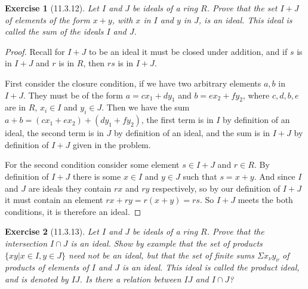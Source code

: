 \documentclass[12pt]{article}
\newtheorem*{exer}{Exercise}
\begin{document}

\begin{exer}[11.3.12]

    Let $I$ and $J$ be ideals of a ring $R$. Prove that the set $I + J$
    of elements of the form $x + y$, with $x$ in $I$ and $y$ in $J$, is
    an ideal. This ideal is called the \textit{sum} of the ideals $I$
    and $J$. 

\end{exer}

\begin{proof}

    Recall for $I + J$ to be an ideal it must be closed under addition,
    and if $s$ is in $I + J$ and $r$ is in $R$, then $rs$ is in $I + J$.

    First consider the closure condition, if we have two arbitrary
    elements $a, b$ in $I + J$. They must be of the form $a = cx_1 +
    dy_1$ and $b = ex_2 + fy_2$, where $c,d,b,e$ are in $R$, $x_i \in I$
    and $y_i \in J$. Then we have the sum $a + b = (cx_1 + ex_2) + (dy_1 +
    fy_2)$, the first term is in $I$ by
    definition of an ideal, the second term is in $J$ by definition of
    an ideal, and the sum is in $I + J$ by definition of $I + J$ given
    in the problem.

    For the second condition consider some element $s \in I + J$ and $r
    \in R$. By definition of $I + J$ there is some $x \in I$ and $y \in
    J$ such that $s = x + y$. And since $I$ and $J$ are ideals they
    contain $rx$ and $ry$ respectively, so by our definition of $I + J$
    it must contain an element $rx + ry = r(x + y) = rs$. So $I + J$
    meets the both conditions, it is therefore an ideal.

\end{proof}


\begin{exer}[11.3.13]

    Let $I$ and $J$ be ideals of a ring $R$. Prove that the intersection
    $I \cap J$ is an ideal. Show by example that the set of products
    $\{xy | x \in I, y \in J\}$ need not be an ideal, but that the set
    of finite sums $\Sigma x_\nu y_\nu$ of products of elements of $I$
    and $J$ is an ideal. This ideal is called the \textit{product
    ideal}, and is denoted by $IJ$. Is there a relation between $IJ$ and
    $I\cap J$?

\end{exer}
\end{document}
